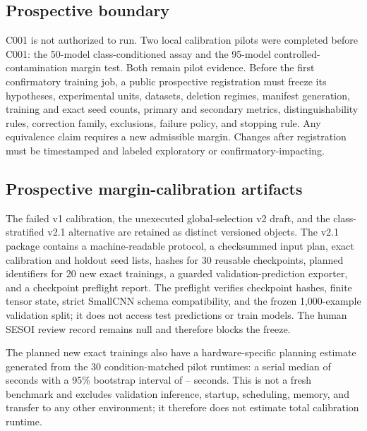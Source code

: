 \subsection{Prospective boundary}
C001 is not authorized to run. Two local calibration pilots were completed before C001:
the 50-model class-conditioned assay and the 95-model controlled-contamination margin test.
Both remain pilot evidence. Before the first confirmatory training job, a public prospective
registration must freeze its hypotheses, experimental units, datasets, deletion regimes,
manifest generation, training and exact seed counts, primary and secondary metrics,
distinguishability rules, correction family, exclusions, failure policy, and stopping rule.
Any equivalence claim requires a new admissible margin. Changes after registration must be
timestamped and labeled exploratory or confirmatory-impacting.

\subsection{Prospective margin-calibration artifacts}
The failed v1 calibration, the unexecuted global-selection v2 draft, and the class-stratified
v2.1 alternative are retained as distinct versioned objects.  The v2.1 package contains a
machine-readable protocol, a checksummed input plan, exact calibration and holdout seed lists,
hashes for 30 reusable checkpoints, planned identifiers for 20 new exact trainings, a guarded
validation-prediction exporter, and a checkpoint preflight report.  The preflight verifies
checkpoint hashes, finite tensor state, strict SmallCNN schema compatibility, and the frozen
1,000-example validation split; it does not access test predictions or train models.  The human
SESOI review record remains null and therefore blocks the freeze.

The \VTwoOneNewTrainingJobs{} planned new exact trainings also have a hardware-specific planning
estimate generated from the 30 condition-matched pilot runtimes: a serial median of
\VTwoOneTrainingMedianSeconds{} seconds with a 95\% bootstrap interval of
\VTwoOneTrainingLowSeconds{}--\VTwoOneTrainingHighSeconds{} seconds.  This is not a fresh
benchmark and excludes validation inference, startup, scheduling, memory, and transfer to any
other environment; it therefore does not estimate total calibration runtime.
